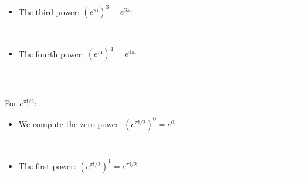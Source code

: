 \documentclass[11pt]{article}
\providecommand{\tightlist}{%
      \setlength{\itemsep}{0pt}\setlength{\parskip}{0pt}}
\begin{document}
    \begin{center}
    \end{center}
    { \hspace*{\fill} \\}
    
    \begin{itemize}
\tightlist
\item
  The third power: \((e^{\pi\mathrm{i}})^3 = e^{3\pi\mathrm{i}}\)
\end{itemize}

    \begin{center}
    \end{center}
    { \hspace*{\fill} \\}
    
    \begin{itemize}
\tightlist
\item
  The fourth power: \((e^{\pi\mathrm{i}})^4 = e^{4\pi\mathrm{i}}\)
\end{itemize}

    \begin{center}
    \end{center}
    { \hspace*{\fill} \\}
    
    \begin{center}\rule{0.5\linewidth}{0.5pt}\end{center}

    For \(e^{\pi\mathrm{i}/{2}}\):

\begin{itemize}
\tightlist
\item
  We compute the zero power: \((e^{\pi\mathrm{i}/{2}})^0 = e^0\)
\end{itemize}

    \begin{center}
    \end{center}
    { \hspace*{\fill} \\}
    
    \begin{itemize}
\tightlist
\item
  The first power: \((e^{\pi\mathrm{i}/{2}})^1 = e^{\pi\mathrm{i}/{2}}\)
\end{itemize}
\end{document}
